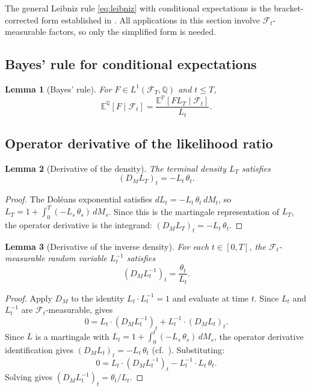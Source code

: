 \documentclass[11pt]{article}
\theoremstyle{plain}
\newtheorem{lemma}{Lemma}[section]
\theoremstyle{definition}
\theoremstyle{remark}
\newcommand{\E}{\mathbb{E}}
\newcommand{\F}{\mathcal{F}}
\newcommand{\PP}{\mathbb{P}}
\newcommand{\QQ}{\mathbb{Q}}
\begin{document}
The general Leibniz rule \eqref{eq:leibniz} with conditional expectations is
the bracket-corrected form established in \cite{Fontes2026g}. All applications
in this section involve $\F_t$-measurable factors, so only the simplified form
is needed.

\subsection{Bayes' rule for conditional expectations}

\begin{lemma}[Bayes' rule]\label{lem:bayes}
For $F \in L^1(\F_T, \QQ)$ and $t \le T$,
\begin{equation}\label{eq:bayes}
\E^{\QQ}[F \mid \F_t] = \frac{\E^{\PP}[F L_T \mid \F_t]}{L_t}.
\end{equation}
\end{lemma}

\subsection{Operator derivative of the likelihood ratio}

\begin{lemma}[Derivative of the density]\label{lem:DL}
The terminal density $L_T$ satisfies
\begin{equation}\label{eq:DL}
(D_M L_T)_t = -L_t\,\theta_t.
\end{equation}
\end{lemma}

\begin{proof}
The Dol\'eans exponential satisfies $dL_t = -L_t\,\theta_t\,dM_t$, so
$L_T = 1 + \int_0^T (-L_s\,\theta_s)\,dM_s$. Since this is the martingale
representation of $L_T$, the operator derivative is the integrand:
$(D_M L_T)_t = -L_t\,\theta_t$.
\end{proof}

\begin{lemma}[Derivative of the inverse density]\label{lem:DLinv}
For each $t \in [0,T]$, the $\F_t$-measurable random variable $L_t^{-1}$
satisfies
\begin{equation}\label{eq:DLinv}
(D_M L_t^{-1})_t = \frac{\theta_t}{L_t}.
\end{equation}
\end{lemma}

\begin{proof}
Apply $D_M$ to the identity $L_t \cdot L_t^{-1} = 1$ and evaluate at time $t$.
Since $L_t$ and $L_t^{-1}$
are $\F_t$-measurable,  gives
\[
0 = L_t \cdot (D_M L_t^{-1})_t + L_t^{-1} \cdot (D_M L_t)_t.
\]
Since $L$ is a martingale with $L_t = 1 + \int_0^t (-L_s\,\theta_s)\,dM_s$,
the operator derivative identification gives
$(D_M L_t)_t = -L_t\,\theta_t$ (cf.~). Substituting:
\[
0 = L_t \cdot (D_M L_t^{-1})_t - L_t^{-1} \cdot L_t\,\theta_t.
\]
Solving gives $(D_M L_t^{-1})_t = \theta_t / L_t$.
\end{proof}
\end{document}
